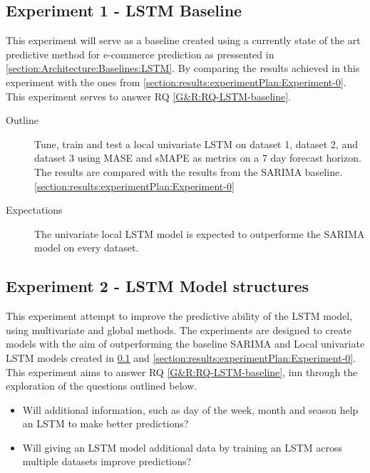\subsection{Experiment 1 - LSTM Baseline}
\label{section:results:experimentPlan:Experiment-1}
This experiment will serve as a baseline created using a currently state of the art predictive method
for e-commerce prediction as pressented in \cref{section:Architecture:Baselines:LSTM}.
By comparing the results achieved in this experiment with the ones from \cref{section:results:experimentPlan:Experiment-0}.
This experiment serves to answer RQ \cref{G&R:RQ-LSTM-baseline}.

\begin{description}
  \item[Outline]{
                  Tune, train and test a local univariate LSTM on dataset 1,
                  dataset 2, and dataset 3 using MASE and sMAPE as metrics on a 7 day forecast horizon.
                  The results are compared with the results from the SARIMA baseline. \cref{section:results:experimentPlan:Experiment-0}}
\end{description}

\begin{description}
  \item[Expectations]{
                      The univariate local LSTM model is expected to outperforme the SARIMA model on every dataset.                    
                     }
\end{description}




\subsection{Experiment 2 - LSTM Model structures}
\label{section:results:experimentPlan:Experiment-2}
This experiment attempt to improve the predictive ability of the LSTM model,
using multivariate and global methods.
The experiments are designed to create models with the aim of outperforming the baseline
SARIMA and Local univariate LSTM models created in \cref{section:results:experimentPlan:Experiment-1} and \cref{section:results:experimentPlan:Experiment-0}.
This experiment aims to answer RQ \cref{G&R:RQ-LSTM-baseline},
inn through the exploration of the questions outlined below.

\begin{itemize}
  \item {Will additional information, such as day of the week, month and season help an LSTM to make better predictions?}
  \item {Will giving an LSTM model additional data by training an LSTM across multiple datasets improve predictions?}
\end{itemize}

